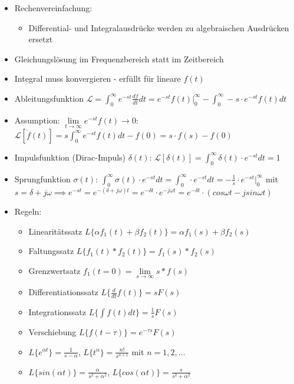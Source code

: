 \documentclass[paper=a4, fontsize=11pt]{scrartcl} %
\numberwithin{equation}{section} %
\numberwithin{figure}{section} %
\numberwithin{table}{section} %
\begin{document}
\begin{itemize}
\item Rechenvereinfachung:
\begin{itemize}
\item Differential- und Integralausdrücke werden zu algebraischen Ausdrücken ersetzt
\end{itemize}
\item Gleichungslösung im Frequenzbereich statt im Zeitbereich
\item Integral muss konvergieren - erfüllt für lineare $f(t)$
\item Ableitungsfunktion $\mathcal{L} = \int_0^\infty e^{-st} \frac{df}{dt} dt = e^{-st} f(t) |_0^\infty - \int_0^\infty - s \cdot e^{-st} f(t) dt$
\item Assumption: $\lim\limits_{t \rightarrow \infty} e^{-st} f(t) \rightarrow 0$: $\mathcal{L}[\dot f(t)] = s \int_0^\infty e^{-st} f(t) dt - f(0) = s \cdot f(s) - f(0)$
\item Impulsfunktion (Dirac-Impuls) $\delta(t)$: $\mathcal{L}[\delta(t)] = \int_0^\infty \delta(t) \cdot e^{-st} dt = 1$
\item Sprungfunktion $\sigma(t)$: $\int_0^\infty \sigma(t) \cdot e^{-st} dt = \int_0^\infty \cdot e^{-st} dt = - \frac{1}{s} \cdot e^{-st} |_0^{\infty}$ mit $s = \delta + j \omega \implies e^{-st} = e^{-(\delta + j \omega)t} = e^{-\delta t} \cdot e^{-j \omega t} = e^{- \delta t} \cdot (cos \omega t - j sin \omega t)$
\item Regeln:
\begin{itemize}
\item Linearitätssatz $L\{\alpha f_1(t) + \beta f_2(t)\} = \alpha f_1(s) + \beta f_2(s)$
\item Faltungssatz $L\{f_1(t) * f_2(t)\} = f_1(s) * f_2(s)$
\item Grenzwertsatz $f_1(t=0) = \lim\limits_{s \rightarrow \infty} s * f(s)$
\item Differentiationssatz $L\{\frac{d}{dt}f(t)\} = s F(s)$
\item Integrationssatz $L\{\int f(t) dt\} = \frac{1}{s} F(s)$
\item Verschiebung $L\{f(t-\tau)\} = e^{-\tau s} F(s)$
\item $L\{e^{\alpha t}\} = \frac{1}{s-\alpha}$, $L\{t^n\} = \frac{n!}{s^{n+1}}$ mit $n = 1,2,...$
\item $L\{sin(\alpha t)\} = \frac{\alpha}{s^2 + \alpha^2}$,  $L\{cos(\alpha t)\} = \frac{s}{s^2 + \alpha^2}$
\end{itemize}
\end{itemize}
\end{document}
